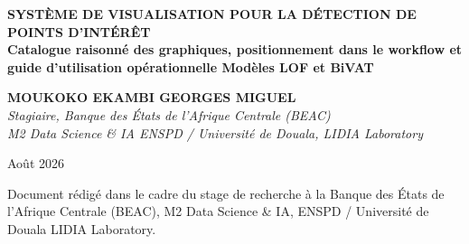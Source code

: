 \documentclass[12pt,a4paper]{article}
\begin{document}
\begin{titlepage}
\centering
\vspace*{2cm}

{\LARGE\bfseries
SYSTÈME DE VISUALISATION POUR LA DÉTECTION DE POINTS D'INTÉRÊT\\[0.4em]
\large\normalfont
Catalogue raisonné des graphiques, positionnement dans le workflow
et guide d'utilisation opérationnelle  Modèles LOF et BiVAT\\[0.4em]
}

\vspace{2cm}

{\large\bfseries MOUKOKO EKAMBI GEORGES MIGUEL}\\[0.5em]
{\normalsize\itshape
Stagiaire, Banque des États de l'Afrique Centrale (BEAC)\\
M2 Data Science \& IA  ENSPD / Université de Douala, LIDIA Laboratory
}

\vspace{2cm}

{\normalsize Août 2026}

\vfill

{\small
Document rédigé dans le cadre du stage de recherche à la Banque des États
de l'Afrique Centrale (BEAC), M2 Data Science \& IA,
ENSPD / Université de Douala  LIDIA Laboratory.
}
\end{titlepage}

\begin{abstract}
Ce document décrit le système complet de visualisation associé à l'outil
de détection de points d'intérêt dans les données monétaires BEAC-CEMAC,
développé dans le cadre d'une étude comparative à deux modèles : le Local
Outlier Factor (LOF, Modèle~1) et BiVAT (\textit{Bidirectional
VAE-Associative Transformer}, Modèle~2). Pour chaque graphique, trois
informations sont documentées avec le même niveau de rigueur que les
documents méthodologiques compagnons : la pertinence analytique dans le
contexte BEAC, le positionnement précis dans le workflow de détection en
quatre phases (diagnostic des données, calibration interne, production des
résultats, comparaison inter-modèles), et les données requises pour sa
production. Le document identifie quatorze graphiques issus du corpus
initial, évalue leur pertinence individuelle, en écarte deux pour des
raisons méthodologiques documentées, et propose sept graphiques
supplémentaires absents du corpus initial mais nécessaires à la complétude
du système visuel. Le catalogue récapitulatif final (section~6) constitue
le guide d'implémentation opérationnelle de l'outil.

\bigskip
\noindent\textbf{Mots-clés :} visualisation, détection d'anomalies,
séries temporelles financières, LOF, BiVAT, BEAC, CEMAC, workflow,
points d'intérêt, audit macroprudentiel.
\end{abstract}
\end{document}
